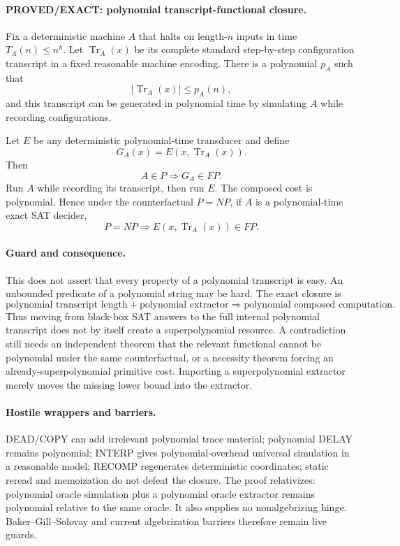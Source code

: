 \documentclass[11pt]{article}
\begin{document}
\paragraph{PROVED/EXACT: polynomial transcript-functional closure.}
Fix a deterministic machine $A$ that halts on length-$n$ inputs in time $T_A(n)\le n^k$. Let $\operatorname{Tr}_A(x)$ be its complete standard step-by-step configuration transcript in a fixed reasonable machine encoding. There is a polynomial $p_A$ such that
\[
 |\operatorname{Tr}_A(x)|\le p_A(n),
\]
and this transcript can be generated in polynomial time by simulating $A$ while recording configurations.

Let $E$ be any deterministic polynomial-time transducer and define
\[
 G_A(x)=E(x,\operatorname{Tr}_A(x)).
\]
Then
\[
 \boxed{A\in P\Longrightarrow G_A\in FP.}
\]
Run $A$ while recording its transcript, then run $E$. The composed cost is polynomial. Hence under the counterfactual $P=NP$, if $A$ is a polynomial-time exact SAT decider,
\[
 \boxed{P=NP\Longrightarrow E(x,\operatorname{Tr}_A(x))\in FP.}
\]

\paragraph{Guard and consequence.}
This does not assert that every property of a polynomial transcript is easy. An unbounded predicate of a polynomial string may be hard. The exact closure is
\[
 \boxed{\text{polynomial transcript length}+\text{polynomial extractor}
 \Longrightarrow\text{polynomial composed computation}.}
\]
Thus moving from black-box SAT answers to the full internal polynomial transcript does not by itself create a superpolynomial resource. A contradiction still needs an independent theorem that the relevant functional cannot be polynomial under the same counterfactual, or a necessity theorem forcing an already-superpolynomial primitive cost. Importing a superpolynomial extractor merely moves the missing lower bound into the extractor.

\paragraph{Hostile wrappers and barriers.}
DEAD/COPY can add irrelevant polynomial trace material; polynomial DELAY remains polynomial; INTERP gives polynomial-overhead universal simulation in a reasonable model; RECOMP regenerates deterministic coordinates; static reread and memoization do not defeat the closure. The proof relativizes: polynomial oracle simulation plus a polynomial oracle extractor remains polynomial relative to the same oracle. It also supplies no nonalgebrizing hinge. Baker--Gill--Solovay and current algebrization barriers therefore remain live guards.
\end{document}
